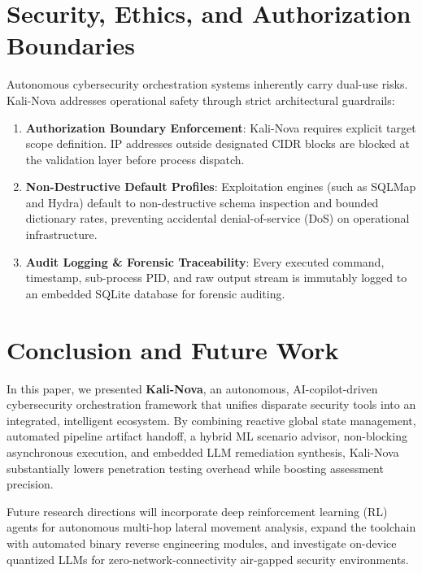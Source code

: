 \documentclass[conference]{IEEEtran}
\begin{document}
\section{Security, Ethics, and Authorization Boundaries}
Autonomous cybersecurity orchestration systems inherently carry dual-use risks. Kali-Nova addresses operational safety through strict architectural guardrails:
\begin{enumerate}
    \item \textbf{Authorization Boundary Enforcement}: Kali-Nova requires explicit target scope definition. IP addresses outside designated CIDR blocks are blocked at the validation layer before process dispatch.
    \item \textbf{Non-Destructive Default Profiles}: Exploitation engines (such as SQLMap and Hydra) default to non-destructive schema inspection and bounded dictionary rates, preventing accidental denial-of-service (DoS) on operational infrastructure.
    \item \textbf{Audit Logging \& Forensic Traceability}: Every executed command, timestamp, sub-process PID, and raw output stream is immutably logged to an embedded SQLite database for forensic auditing.
\end{enumerate}

\section{Conclusion and Future Work}
In this paper, we presented \textbf{Kali-Nova}, an autonomous, AI-copilot-driven cybersecurity orchestration framework that unifies disparate security tools into an integrated, intelligent ecosystem. By combining reactive global state management, automated pipeline artifact handoff, a hybrid ML scenario advisor, non-blocking asynchronous execution, and embedded LLM remediation synthesis, Kali-Nova substantially lowers penetration testing overhead while boosting assessment precision.

Future research directions will incorporate deep reinforcement learning (RL) agents for autonomous multi-hop lateral movement analysis, expand the toolchain with automated binary reverse engineering modules, and investigate on-device quantized LLMs for zero-network-connectivity air-gapped security environments.
\end{document}
